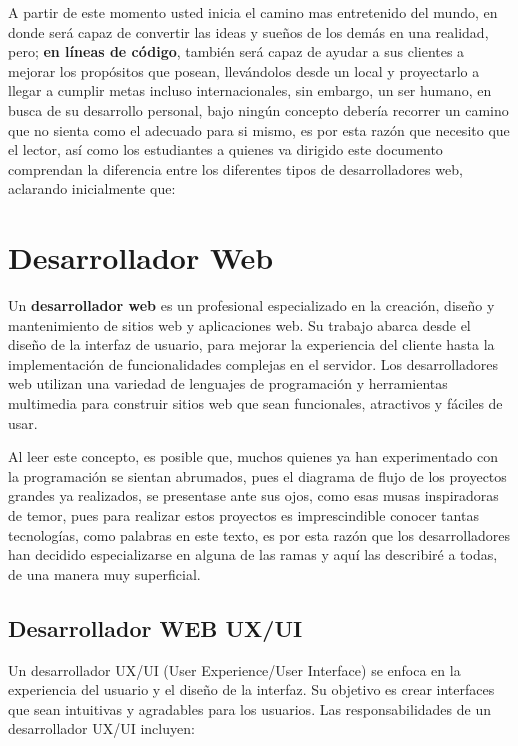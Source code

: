 \documentclass[
  letterpaper,
  DIV=11,
  numbers=noendperiod]{scrreprt}
\begin{document}
A partir de este momento usted inicia el camino mas entretenido del
mundo, en donde será capaz de convertir las ideas y sueños de los demás
en una realidad, pero; \textbf{en líneas de código}, también será capaz
de ayudar a sus clientes a mejorar los propósitos que posean,
llevándolos desde un local y proyectarlo a llegar a cumplir metas
incluso internacionales, sin embargo, un ser humano, en busca de su
desarrollo personal, bajo ningún concepto debería recorrer un camino que
no sienta como el adecuado para si mismo, es por esta razón que necesito
que el lector, así como los estudiantes a quienes va dirigido este
documento comprendan la diferencia entre los diferentes tipos de
desarrolladores web, aclarando inicialmente que:

\section{\texorpdfstring{\textbf{Desarrollador
Web}}{Desarrollador Web}}\label{desarrollador-web}

Un \textbf{desarrollador web} es un profesional especializado en la
creación, diseño y mantenimiento de sitios web y aplicaciones web. Su
trabajo abarca desde el diseño de la interfaz de usuario, para mejorar
la experiencia del cliente hasta la implementación de funcionalidades
complejas en el servidor. Los desarrolladores web utilizan una variedad
de lenguajes de programación y herramientas multimedia para construir
sitios web que sean funcionales, atractivos y fáciles de usar.

Al leer este concepto, es posible que, muchos quienes ya han
experimentado con la programación se sientan abrumados, pues el diagrama
de flujo de los proyectos grandes ya realizados, se presentase ante sus
ojos, como esas musas inspiradoras de temor, pues para realizar estos
proyectos es imprescindible conocer tantas tecnologías, como palabras en
este texto, es por esta razón que los desarrolladores han decidido
especializarse en alguna de las ramas y aquí las describiré a todas, de
una manera muy superficial.

\subsection{\texorpdfstring{\textbf{Desarrollador WEB
UX/UI}}{Desarrollador WEB UX/UI}}\label{desarrollador-web-uxui}

Un desarrollador UX/UI (User Experience/User Interface) se enfoca en la
experiencia del usuario y el diseño de la interfaz. Su objetivo es crear
interfaces que sean intuitivas y agradables para los usuarios. Las
responsabilidades de un desarrollador UX/UI incluyen:
\end{document}
